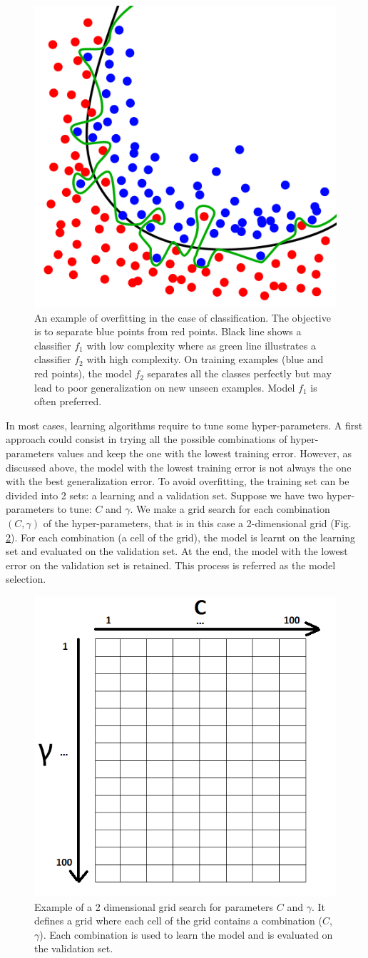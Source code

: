 \begin{figure}[h!]
	\centering
	\includegraphics[width=0.4\linewidth]{images/Overfitting}
	\caption{An example of overfitting in the case of classification. The objective is to separate blue points from red points. Black line shows a classifier $f_1$ with low complexity where as green line illustrates a classifier $f_2$ with high complexity. On training examples (blue and red points), the model $f_2$ separates all the classes perfectly but may lead to poor generalization on new unseen examples. Model $f_1$ is often preferred.}
	\label{fig:Overfitting}
\end{figure}

In most cases, learning algorithms require to tune some hyper-parameters. A first approach could consist in trying all the possible combinations of hyper-parameters values and keep the one with the lowest training error. However, as discussed above, the model with the lowest training error is not always the one with the best generalization error.  To avoid overfitting, the training set can be divided into 2 sets: a learning and a validation set. Suppose we have two hyper-parameters to tune: $C$ and $\gamma$. We make a grid search for each combination $(C,\gamma)$ of the hyper-parameters, that is in this case a 2-dimensional grid (Fig. \ref{fig:GridSearch}). For each combination (a cell of the grid), the model is learnt on the learning set and evaluated on the validation set. At the end, the model with the lowest error on the validation set is retained. This process is referred as the model selection. 

\begin{figure}[h!]
	\centering
	\includegraphics[width=0.4\linewidth]{images/GridSearch}
	\caption{Example of a 2 dimensional grid search for parameters $C$ and $\gamma$. It defines a grid where each cell of the grid contains a combination ($C$, $\gamma$). Each combination is used to learn the model and is evaluated on the validation set.}
	\label{fig:GridSearch}
\end{figure}

